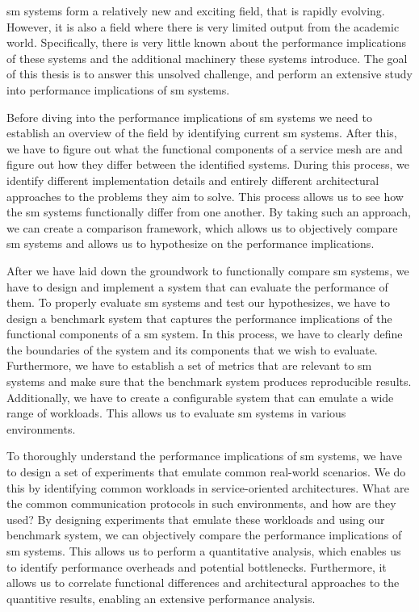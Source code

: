 \Gls{sm} systems form a relatively new and exciting field, that is rapidly evolving. However, it is also a field where there is very limited output from the academic world. Specifically, there is very little known about the performance implications of these systems and the additional machinery these systems introduce. The goal of this thesis is to answer this unsolved challenge, and perform an extensive study into performance implications of \gls{sm} systems. 

Before diving into the performance implications of \gls{sm} systems we need to establish an overview of the field by identifying current \gls{sm} systems. After this, we have to figure out what the functional components of a service mesh are and figure out how they differ between the identified systems. During this process, we identify different implementation details and entirely different architectural approaches to the problems they aim to solve. This process allows us to see how the \gls{sm} systems functionally differ from one another. By taking such an approach, we can create a comparison framework, which allows us to objectively compare \gls{sm} systems and allows us to hypothesize on the performance implications.

After we have laid down the groundwork to functionally compare \gls{sm} systems, we have to design and implement a system that can evaluate the performance of them. To properly evaluate \gls{sm} systems and test our hypothesizes, we have to design a benchmark system that captures the performance implications of the functional components of a \gls{sm} system. In this process, we have to clearly define the boundaries of the system and its components that we wish to evaluate. Furthermore, we have to establish a set of metrics that are relevant to \gls{sm} systems and make sure that the benchmark system produces reproducible results. Additionally, we have to create a configurable system that can emulate a wide range of workloads. This allows us to evaluate \gls{sm} systems in various environments.

To thoroughly understand the performance implications of \gls{sm} systems, we have to design a set of experiments that emulate common real-world scenarios. We do this by identifying common workloads in service-oriented architectures. What are the common communication protocols in such environments, and how are they used? By designing experiments that emulate these workloads and using our benchmark system, we can objectively compare the performance implications of \gls{sm} systems. This allows us to perform a quantitative analysis, which enables us to identify performance overheads and potential bottlenecks. Furthermore, it allows us to correlate functional differences and architectural approaches to the quantitive results, enabling an extensive performance analysis. 



